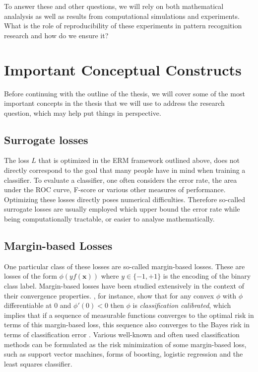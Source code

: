 \documentclass[twoside]{memoir}\usepackage[]{graphicx}\usepackage{xcolor}
\renewcommand{\cite}{\citep}
\begin{document}
To answer these and other questions, we will rely on both mathematical analalysis as well as results from computational simulations and experiments. What is the role of reproducibility of these experiments in pattern recognition research and how do we ensure it?

\section{Important Conceptual Constructs}

Before continuing with the outline of the thesis, we will cover some of the most important concepts in the thesis that we will use to address the research question, which may help put things in perspective.

\subsection{Surrogate losses}

The loss $L$ that is optimized in the ERM framework outlined above, does not directly correspond to the goal that many people have in mind when training a classifier. To evaluate a classifier, one often considers the error rate, the area under the ROC curve, F-score or various other measures of performance. Optimizing these losses directly poses numerical difficulties. Therefore so-called surrogate losses are usually employed which upper bound the error rate while being computationally tractable, or easier to analyse mathematically.

\subsection{Margin-based Losses}
One particular class of these losses are so-called margin-based losses. These are losses of the form $\phi(y f(\mathbf{x}))$ where $y \in \{-1,+1\}$ is the encoding of the binary class label. Margin-based losses have been studied extensively in the context of their convergence properties. \citet{Bartlett2006}, for instance, show that for any convex $\phi$ with $\phi$ differentiable at $0$ and $\phi'(0)<0$ then $\phi$ is \emph{classification calibrated}, which implies that if a sequence of measurable functions converges to the optimal risk in terms of this margin-based loss, this sequence also converges to the Bayes risk in terms of classification error \cite[Theorem 1.3c]{Bartlett2006}. Various well-known and often used classification methods can be formulated as the risk minimization of some margin-based loss, such as support vector machines, forms of boosting, logistic regression and the least squares classifier.
\end{document}
